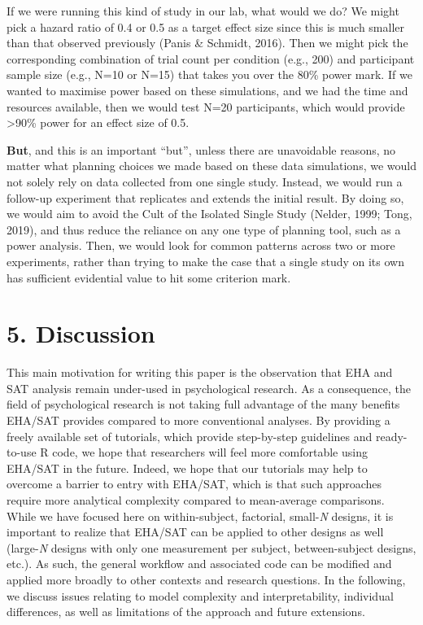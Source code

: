 \documentclass[
  man, donotrepeattitle,floatsintext]{apa6}
\begin{document}
If we were running this kind of study in our lab, what would we do?
We might pick a hazard ratio of 0.4 or 0.5 as a target effect size since this is much smaller than that observed previously (Panis \& Schmidt, 2016).
Then we might pick the corresponding combination of trial count per condition (e.g., 200) and participant sample size (e.g., N=10 or N=15) that takes you over the 80\% power mark.
If we wanted to maximise power based on these simulations, and we had the time and resources available, then we would test N=20 participants, which would provide \textgreater90\% power for an effect size of 0.5.

\textbf{But}, and this is an important ``but'', unless there are unavoidable reasons, no matter what planning choices we made based on these data simulations, we would not solely rely on data collected from one single study.
Instead, we would run a follow-up experiment that replicates and extends the initial result.
By doing so, we would aim to avoid the Cult of the Isolated Single Study (Nelder, 1999; Tong, 2019), and thus reduce the reliance on any one type of planning tool, such as a power analysis.
Then, we would look for common patterns across two or more experiments, rather than trying to make the case that a single study on its own has sufficient evidential value to hit some criterion mark.

\section{5. Discussion}\label{discussion}

This main motivation for writing this paper is the observation that EHA and SAT analysis remain under-used in psychological research. As a consequence, the field of psychological research is not taking full advantage of the many benefits EHA/SAT provides compared to more conventional analyses. By providing a freely available set of tutorials, which provide step-by-step guidelines and ready-to-use R code, we hope that researchers will feel more comfortable using EHA/SAT in the future. Indeed, we hope that our tutorials may help to overcome a barrier to entry with EHA/SAT, which is that such approaches require more analytical complexity compared to mean-average comparisons. While we have focused here on within-subject, factorial, small-\emph{N} designs, it is important to realize that EHA/SAT can be applied to other designs as well (large-\emph{N} designs with only one measurement per subject, between-subject designs, etc.). As such, the general workflow and associated code can be modified and applied more broadly to other contexts and research questions. In the following, we discuss issues relating to model complexity and interpretability, individual differences, as well as limitations of the approach and future extensions.
\end{document}
